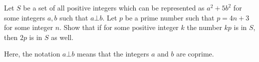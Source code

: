 Let $ S$ be a set of all positive integers which can be represented as $ a^2 + 5b^2$ for some integers $ a,b$ such that $ a\bot b$. Let $ p$ be a prime number such that $ p = 4n + 3$ for some integer $ n$. Show that if for some positive integer $ k$ the number $ kp$ is in $ S$, then $ 2p$ is in $ S$ as well.

Here, the notation $ a\bot b$ means that the integers $ a$ and $ b$ are coprime.